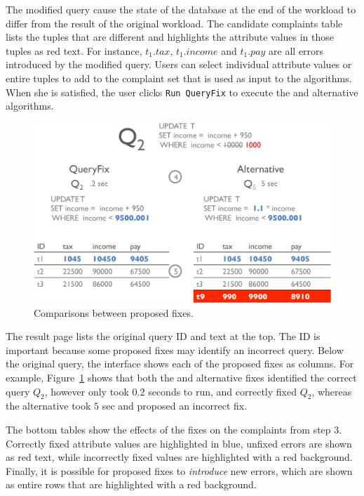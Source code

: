 The modified query cause the state of the database at the end of the workload
to differ from the result of the original workload.  The candidate complaints table lists the tuples
that are different and highlights the attribute values in those tuples as red text.  For instance,
$t_1.tax$, $t_1.income$ and $t_1.pay$ are all errors introduced by the modified query. 
 Users can select individual
attribute values or entire tuples to add to the complaint set that is used as input to the \sys algorithms.  
When she is satisfied, the user clicks \texttt{Run QueryFix} to execute the \sys and alternative algorithms.


\begin{figure}[h]
\centering
  \includegraphics[width = .85\columnwidth]{figures/demo2_exp2}
  \caption{Comparisons between proposed fixes.}
  \label{f:demo2} 
\end{figure}

  The result page lists the original query ID and text at the top.  The ID 
is important because some proposed fixes may identify an incorrect query.  Below the original query,
the interface shows each of the proposed fixes as columns.  For example, Figure~\ref{f:demo2} shows 
that both the \sys and alternative fixes identified the correct query $Q_2$, however \sys only took $0.2$ seconds
to run, and correctly fixed $Q_2$, whereas the alternative took $5$ sec and proposed an incorrect fix.

 The bottom tables show the effects of the fixes on the complaints from
step 3.  Correctly fixed attribute values are highlighted in blue, unfixed errors are shown as red text, while incorrectly
fixed values are highlighted with a red background.  Finally, it is possible for proposed fixes to 
{\it introduce} new errors, which are shown as entire rows that are highlighted with a red background.







